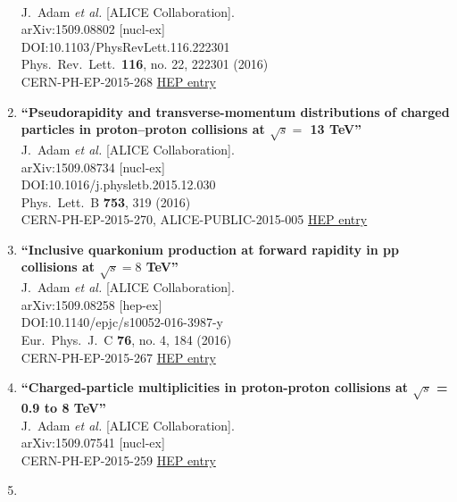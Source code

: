 \begin{enumerate}
  \\{}J.~Adam {\it et al.} [ALICE Collaboration].
  \\{}arXiv:1509.08802 [nucl-ex]
  \\{}DOI:10.1103/PhysRevLett.116.222301
  \\{}Phys.\ Rev.\ Lett.\  {\bf 116}, no. 22, 222301 (2016)
  \\{}CERN-PH-EP-2015-268
\href{http://inspirehep.net/record/1395296}{HEP entry}
\item%
{\bf ``Pseudorapidity and transverse-momentum distributions of charged particles in proton–proton collisions at $\sqrt s=$ 13 TeV''}
  \\{}J.~Adam {\it et al.} [ALICE Collaboration].
  \\{}arXiv:1509.08734 [nucl-ex]
  \\{}DOI:10.1016/j.physletb.2015.12.030
  \\{}Phys.\ Lett.\ B {\bf 753}, 319 (2016)
  \\{}CERN-PH-EP-2015-270, ALICE-PUBLIC-2015-005
\href{http://inspirehep.net/record/1395253}{HEP entry}
\item%
{\bf ``Inclusive quarkonium production at forward rapidity in pp collisions at $\sqrt{s}=8$ TeV''}
  \\{}J.~Adam {\it et al.} [ALICE Collaboration].
  \\{}arXiv:1509.08258 [hep-ex]
  \\{}DOI:10.1140/epjc/s10052-016-3987-y
  \\{}Eur.\ Phys.\ J.\ C {\bf 76}, no. 4, 184 (2016)
  \\{}CERN-PH-EP-2015-267
\href{http://inspirehep.net/record/1395099}{HEP entry}
\item%
{\bf ``Charged-particle multiplicities in proton-proton collisions at $\sqrt{s}$ = 0.9 to 8 TeV''}
  \\{}J.~Adam {\it et al.} [ALICE Collaboration].
  \\{}arXiv:1509.07541 [nucl-ex]
  \\{}CERN-PH-EP-2015-259
\href{http://inspirehep.net/record/1394854}{HEP entry}
\item%

\end{enumerate}
